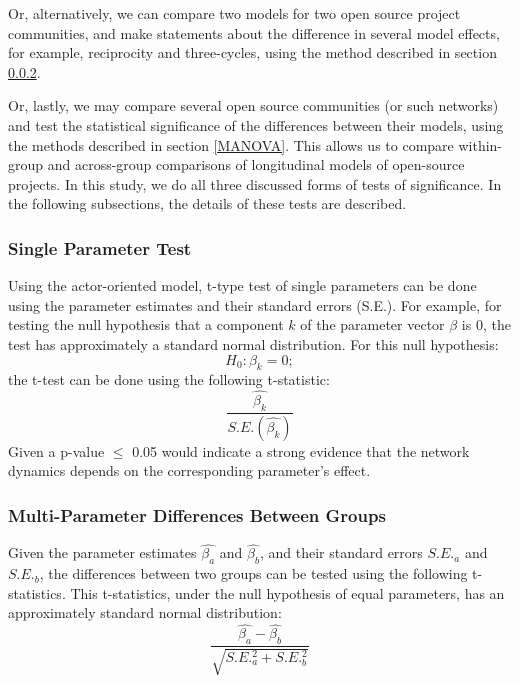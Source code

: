 \documentclass[11pt]{report}
\begin{document}
Or, alternatively, we can compare two models for two open source project communities, and make statements about the difference in several model effects, for example, reciprocity and three-cycles, using the method described in section \ref{multiParameterTest}. 

Or, lastly, we may compare several open source communities (or such networks) and test the statistical significance of the differences between their models, using the methods described in section \ref{MANOVA}. This allows us to compare within-group and across-group comparisons of longitudinal models of open-source projects. In this study, we do all three discussed forms of tests of significance. In the following subsections, the details of these tests are described.   


\subsubsection{Single Parameter Test}
\label{singleParameterTest}
Using the actor-oriented model, t-type test of single parameters can be done using the parameter estimates and their standard errors (S.E.). 
For example, for testing the null hypothesis that a component $k$ of the parameter vector $\beta$ is 0, the test has approximately a standard normal distribution. For this null hypothesis: 
\begin{equation}
H_0: \beta_k = 0;
\end{equation}
the t-test can be done using the following t-statistic:
\begin{equation}
\frac{\hat{\beta_k}}{S.E.(\hat{\beta_k})}
\end{equation}
Given a p-value $\leq$ 0.05 would indicate a strong evidence that the network dynamics depends on the corresponding parameter's effect. 

\subsubsection{Multi-Parameter Differences Between Groups}
\label{multiParameterTest}
Given the parameter estimates $\hat{\beta_a}$ and $\hat{\beta_b}$, and their standard errors $S.E._a$ and $S.E._b$, the differences between two groups can be tested using the following t-statistics. This t-statistics, under the null hypothesis of equal parameters, has an approximately standard normal distribution:
\begin{equation}
\frac{\hat{\beta_a}-\hat{\beta_b}}{\sqrt{S.E._a^2 + S.E._b^2}}
\end{equation}
\end{document}
